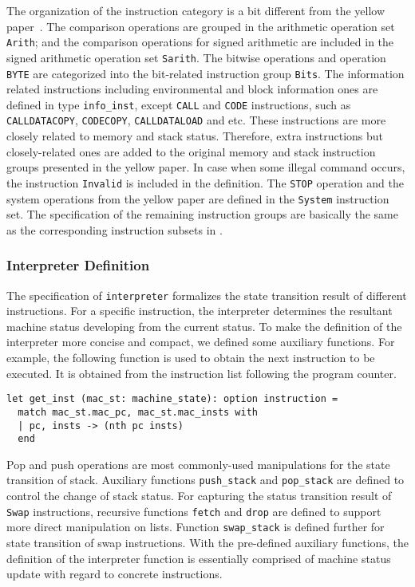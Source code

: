 \documentclass[runningheads]{llncs}
\begin{document}
The organization of the instruction category is a bit different from the yellow paper~\cite{wood2014ethereum}. The comparison operations are grouped in the arithmetic operation set \texttt{Arith}; and the comparison operations for signed arithmetic are included in the signed arithmetic operation set \texttt{Sarith}. The bitwise operations and operation \texttt{BYTE} are categorized into the bit-related instruction group \texttt{Bits}. The information related instructions including environmental and block information ones are defined in type \texttt{info\_inst}, except \texttt{CALL} and \texttt{CODE} instructions, such as \texttt{CALLDATACOPY}, \texttt{CODECOPY}, \texttt{CALLDATALOAD} and etc. These instructions are more closely related to memory and stack status. Therefore, extra instructions but closely-related ones are added to the original memory and stack instruction groups presented in the yellow paper. In case when some illegal command occurs, the instruction \texttt{Invalid} is included in the  definition. The \texttt{STOP} operation and the system operations from the yellow paper are defined in the \texttt{System} instruction set. The specification of the remaining instruction groups are basically the same as the corresponding instruction subsets in \cite{wood2014ethereum}. 

\subsubsection{Interpreter Definition}\label{sec:interpreter}
The specification of \texttt{interpreter} formalizes the state transition result of different instructions. For a specific instruction, the interpreter determines the resultant machine status developing from the current status.
To make the definition of the interpreter more concise and compact, we defined some auxiliary functions. For example, the following function is used to obtain the next instruction to be executed. It is obtained from the instruction list following the program counter. 
\begin{verbatim}
let get_inst (mac_st: machine_state): option instruction =
  match mac_st.mac_pc, mac_st.mac_insts with 
  | pc, insts -> (nth pc insts) 
  end    
\end{verbatim}

Pop and push operations are most commonly-used manipulations for the state transition of stack. Auxiliary functions \texttt{push\_stack} and \texttt{pop\_stack} are defined to control the change of stack status. For capturing the status transition result of \texttt{Swap} instructions, recursive functions \texttt{fetch} and \texttt{drop} are defined to support more direct manipulation on lists. Function \texttt{swap\_stack} is defined further for state transition of swap instructions.
With the pre-defined auxiliary functions, the definition of the interpreter function is essentially comprised of machine status update with regard to concrete instructions. 
\end{document}
